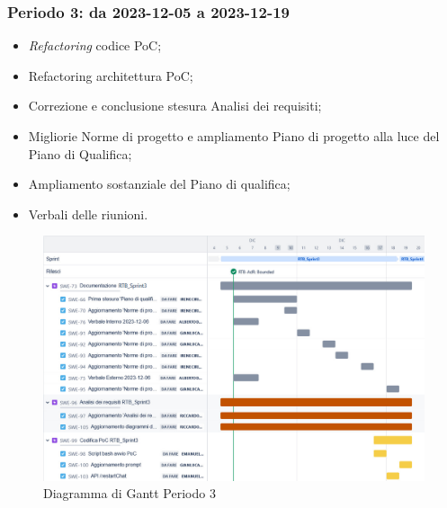 \documentclass[10pt, a4paper]{article}
\begin{document}
\subsubsection{Periodo 3: da 2023-12-05 a 2023-12-19}
\begin{itemize}
    \item \textit{Refactoring\pg} codice PoC;
    \item Refactoring architettura PoC;
    \item Correzione e conclusione stesura Analisi dei requisiti;
    \item Migliorie Norme di progetto e ampliamento Piano di progetto alla luce del Piano di Qualifica;
    \item Ampliamento sostanziale del Piano di qualifica;
    \item Verbali delle riunioni.
\end{itemize}
\begin{figure}[H]
    \centering        
    \includegraphics[width=15.5cm]{gantt/ganttPeriodo3.png}
    \caption{Diagramma di Gantt Periodo 3 }
\end{figure}
\newpage
\end{document}
